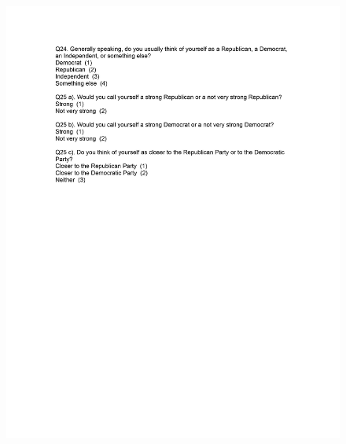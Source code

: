 \documentclass[12pt,econ]{sources/authesis}
\makeatletter
\def\maxwidth{\ifdim\Gin@nat@width>\linewidth\linewidth
\else\Gin@nat@width\fi}
\let\Oldincludegraphics\includegraphics
\renewcommand{\includegraphics}[1]{\Oldincludegraphics[width=\maxwidth]{#1}}
\makeatother
\begin{document}
\begin{figure}[hbt]
  \centering
\includegraphics{data/framing/appendix/questionnaire/questionnaire12.jpg}
\end{figure}
\end{document}
